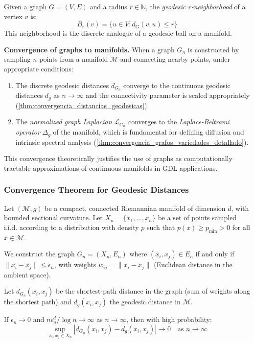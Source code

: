 \begin{definition}\label{def:grafo_vecindad_geodesico}
Given a graph $G = (V, E)$ and a radius $r \in \mathbb{N}$, the \textit{geodesic $r$-neighborhood} of a vertex $v$ is:
\[
B_r(v) = \{u \in V : d_G(v, u) \leq r\}
\]
This neighborhood is the discrete analogue of a geodesic ball on a manifold.
\end{definition}

\textbf{Convergence of graphs to manifolds.}\label{rem:convergencia_grafos_variedades} When a graph $G_n$ is constructed by sampling $n$ points from a manifold $\mathcal{M}$ and connecting nearby points, under appropriate conditions:
\begin{enumerate}
	\item The discrete geodesic distances $d_{G_n}$ converge to the continuous geodesic distances $d_g$ as $n \to \infty$ and the connectivity parameter is scaled appropriately (\autoref{thm:convergencia_distancias_geodesicas}).

	\item The \textit{normalized graph Laplacian} $\mathcal{L}_{G_n}$ converges to the \textit{Laplace-Beltrami operator} $\Delta_g$ of the manifold, which is fundamental for defining diffusion and intrinsic spectral analysis (\autoref{thm:convergencia_grafos_variedades_detallado}).
\end{enumerate}
This convergence theoretically justifies the use of graphs as computationally tractable approximations of continuous manifolds in \gls{GDL} applications.

\subsubsection{Convergence Theorem for Geodesic Distances}

\begin{theorem}\label{thm:convergencia_distancias_geodesicas}
	Let $(\mathcal{M}, g)$ be a compact, connected Riemannian manifold of dimension $d$, with bounded sectional curvature. Let $X_n = \{x_1, \ldots, x_n\}$ be a set of points sampled i.i.d. according to a distribution with density $p$ such that $p(x) \geq p_{\min} > 0$ for all $x \in \mathcal{M}$.

	We construct the graph $G_n = (X_n, E_n)$ where $(x_i, x_j) \in E_n$ if and only if $\|x_i - x_j\| \leq \epsilon_n$, with weights $w_{ij} = \|x_i - x_j\|$ (Euclidean distance in the ambient space).

	Let $d_{G_n}(x_i, x_j)$ be the shortest-path distance in the graph (sum of weights along the shortest path) and $d_g(x_i, x_j)$ the geodesic distance in $\mathcal{M}$.

	If $\epsilon_n \to 0$ and $n \epsilon_n^d / \log n \to \infty$ as $n \to \infty$, then with high probability:
	\[
		\sup_{x_i, x_j \in X_n} \left| d_{G_n}(x_i, x_j) - d_g(x_i, x_j) \right| \to 0 \quad \text{as } n \to \infty
	\]
\end{theorem}

